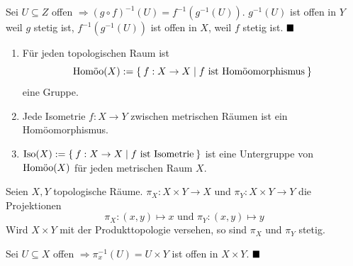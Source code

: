
\begin{beweis}
    Sei $U \subseteq Z$ offen $\Rightarrow (g \circ f)^{-1} (U) = f^{-1} (g^{-1}(U))$.
    $g^{-1}(U)$ ist offen in $Y$ weil $g$ stetig ist, $f^{-1}(g^{-1}(U))$
    ist offen in $X$, weil $f$ stetig ist. $\qed$
\end{beweis}

\begin{bemerkung}
    \begin{enumerate}[label=\alph*)]
        \item Für jeden topologischen Raum ist 
              \[\Homoo(X) := \Set{f: X \rightarrow X | f \text{ ist Homöomorphismus}}\]
              eine Gruppe.
        \item Jede Isometrie $f:X \rightarrow Y$ zwischen metrischen 
              Räumen ist ein Homöomorphismus.
        \item $\Iso(X) := \Set{f:X \rightarrow X | f \text{ ist Isometrie}}$ ist
              eine Untergruppe von $\Homoo(X)$ für jeden
              metrischen Raum $X$.
    \end{enumerate}
\end{bemerkung}

\begin{bemerkung}
    Seien $X, Y$ topologische Räume. $\pi_X: X \times Y \rightarrow X$
    und $\pi_Y: X \times Y \rightarrow Y$ die Projektionen 
    \[\pi_X: (x,y) \mapsto x \text{ und } \pi_Y: (x,y) \mapsto y\]
    Wird $X \times Y$ mit der Produkttopologie versehen, so sind $\pi_X$
    und $\pi_Y$ stetig.
\end{bemerkung}

\begin{beweis}
    Sei $U \subseteq X$ offen $\Rightarrow \pi_x^{-1} (U) = U \times Y$ 
    ist offen in $X \times Y$. $\qed$
\end{beweis}

